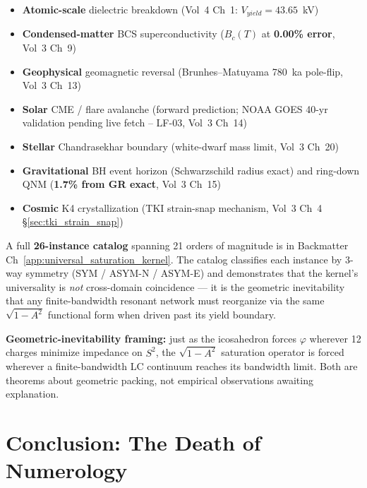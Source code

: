 \begin{itemize}
\item \textbf{Atomic-scale} dielectric breakdown (Vol~4 Ch~1: $V_{yield} = 43.65$~kV)
\item \textbf{Condensed-matter} BCS superconductivity ($B_c(T)$ at \textbf{0.00\% error}, Vol~3 Ch~9)
\item \textbf{Geophysical} geomagnetic reversal (Brunhes--Matuyama 780~ka pole-flip, Vol~3 Ch~13)
\item \textbf{Solar} CME / flare avalanche (forward prediction; NOAA GOES 40-yr validation pending live fetch -- LF-03, Vol~3 Ch~14) %
\item \textbf{Stellar} Chandrasekhar boundary (white-dwarf mass limit, Vol~3 Ch~20)
\item \textbf{Gravitational} BH event horizon (Schwarzschild radius exact) and ring-down QNM (\textbf{1.7\% from GR exact}, Vol~3 Ch~15)
\item \textbf{Cosmic} K4 crystallization (TKI strain-snap mechanism, Vol~3 Ch~4 \S\ref{sec:tki_strain_snap})
\end{itemize}

\noindent A full \textbf{26-instance catalog} spanning 21 orders of magnitude is in Backmatter Ch~\ref{app:universal_saturation_kernel}. The catalog classifies each instance by 3-way symmetry (SYM / ASYM-N / ASYM-E) and demonstrates that the kernel's universality is \textit{not} cross-domain coincidence --- it is the geometric inevitability that any finite-bandwidth resonant network must reorganize via the same $\sqrt{1 - A^2}$ functional form when driven past its yield boundary.

\noindent \textbf{Geometric-inevitability framing:} just as the icosahedron forces $\varphi$ wherever 12 charges minimize impedance on $S^2$, the $\sqrt{1 - A^2}$ saturation operator is forced wherever a finite-bandwidth LC continuum reaches its bandwidth limit. Both are theorems about geometric packing, not empirical observations awaiting explanation.

\section{Conclusion: The Death of Numerology}

